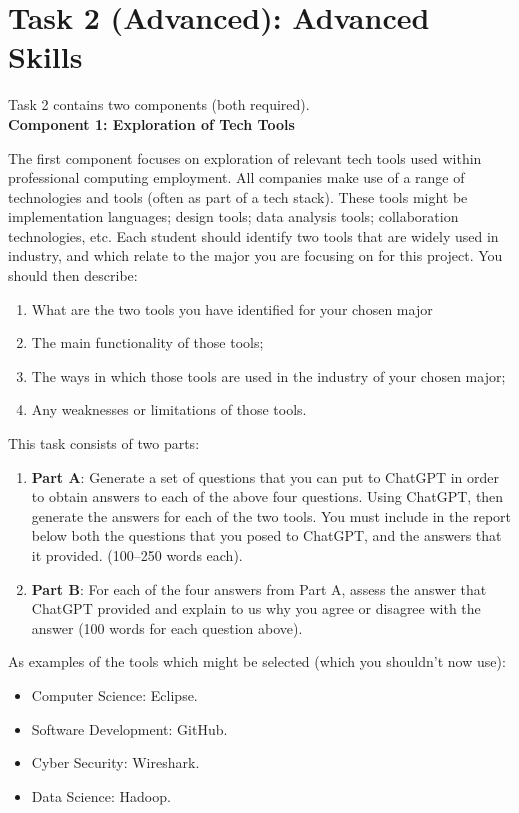 \documentclass[a4paper, 11pt]{report}
\begin{document}
\newpage
\section{Task 2 (Advanced): Advanced Skills}

Task 2 contains two components (both required).\\[2mm]

\textbf{Component 1: Exploration of Tech Tools}

The first component focuses on exploration of relevant tech tools used within professional computing employment. All companies make use of a range of technologies and tools (often as part of a tech stack). These tools might be implementation languages; design tools; data analysis tools; collaboration technologies, etc. Each student should identify two tools that are widely used in industry, and which relate to the major you are focusing on for this project. You should then describe:

\begin{enumerate}
\item What are the two tools you have identified for your chosen major
\item The main functionality of those tools;
\item The ways in which those tools are used in the industry of your chosen major;
\item Any weaknesses or limitations of those tools.
\end{enumerate}

This task consists of two parts:

\begin{enumerate}
\item \textbf{Part A}: Generate a set of questions that you can put to ChatGPT in order to obtain answers to each of the above four questions. Using ChatGPT, then generate the answers for each of the two tools. You must include in the report below both the questions that you posed to ChatGPT, and the answers that it provided.  (100–250 words each).
\item \textbf{Part B}: For each of the four answers from Part A, assess the answer that ChatGPT provided and explain to us why you agree or disagree with the answer (100 words for each question above).
\end{enumerate}


As examples of the tools which might be selected (which you shouldn’t now use):
\begin{itemize}
\item Computer Science: Eclipse.
\item Software Development: GitHub. 
\item Cyber Security: Wireshark. 
\item Data Science: Hadoop.
\end{itemize}
\end{document}
